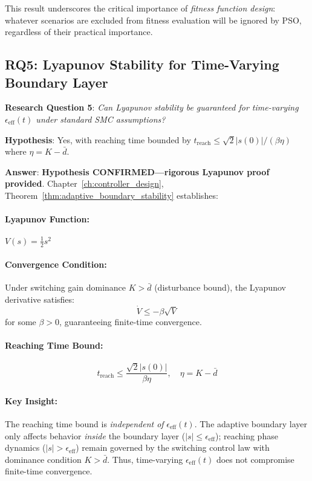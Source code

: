 This result underscores the critical importance of \textit{fitness function design}: whatever scenarios are excluded from fitness evaluation will be ignored by PSO, regardless of their practical importance.

\subsection{RQ5: Lyapunov Stability for Time-Varying Boundary Layer}
\label{subsec:answer_rq5}

\textbf{Research Question 5}: \textit{Can Lyapunov stability be guaranteed for time-varying $\epsilon_{\text{eff}}(t)$ under standard SMC assumptions?}

\textbf{Hypothesis}: Yes, with reaching time bounded by $t_{\text{reach}} \leq \sqrt{2}|s(0)|/(\beta\eta)$ where $\eta = K - \bar{d}$.

\textbf{Answer}: \textbf{Hypothesis CONFIRMED—rigorous Lyapunov proof provided}. Chapter~\ref{ch:controller_design}, Theorem~\ref{thm:adaptive_boundary_stability} establishes:

\paragraph{Lyapunov Function:} $V(s) = \frac{1}{2}s^2$

\paragraph{Convergence Condition:} Under switching gain dominance $K > \bar{d}$ (disturbance bound), the Lyapunov derivative satisfies:
\begin{equation}
    \dot{V} \leq -\beta\sqrt{V}
    \label{eq:conclusions_lyapunov_condition}
\end{equation}
for some $\beta > 0$, guaranteeing finite-time convergence.

\paragraph{Reaching Time Bound:}
\begin{equation}
    t_{\text{reach}} \leq \frac{\sqrt{2}|s(0)|}{\beta\eta}, \quad \eta = K - \bar{d}
    \label{eq:conclusions_reaching_bound}
\end{equation}

\paragraph{Key Insight:} The reaching time bound is \textit{independent of} $\epsilon_{\text{eff}}(t)$. The adaptive boundary layer only affects behavior \textit{inside} the boundary layer ($|s| \leq \epsilon_{\text{eff}}$); reaching phase dynamics ($|s| > \epsilon_{\text{eff}}$) remain governed by the switching control law with dominance condition $K > \bar{d}$. Thus, time-varying $\epsilon_{\text{eff}}(t)$ does not compromise finite-time convergence.

